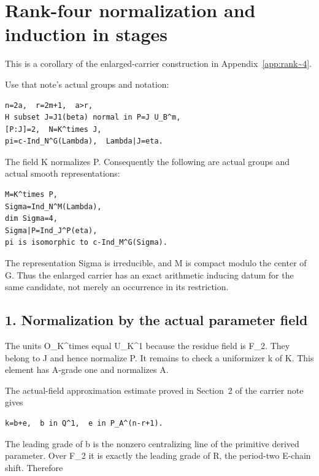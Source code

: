 \clearpage
\section{Rank-four normalization and induction in stages}\label{app:rank~4_stages}

This is a corollary of the enlarged-carrier construction in
Appendix~\ref{app:rank~4}.

Use that note's actual groups and notation:

\begin{Verbatim}[fontsize=\small,breaklines=true,breakanywhere=true]
n=2a,  r=2m+1,  a>r,
H subset J=J1(beta) normal in P=J U_B^m,
[P:J]=2,  N=K^times J,
pi=c-Ind_N^G(Lambda),  Lambda|J=eta.
\end{Verbatim}

The field K normalizes P. Consequently the following are actual groups
and actual smooth representations:

\begin{Verbatim}[fontsize=\small,breaklines=true,breakanywhere=true]
M=K^times P,
Sigma=Ind_N^M(Lambda),
dim Sigma=4,
Sigma|P=Ind_J^P(eta),
pi is isomorphic to c-Ind_M^G(Sigma).
\end{Verbatim}

The representation Sigma is irreducible, and M is compact modulo the
center of G. Thus the enlarged carrier has an exact arithmetic inducing
datum for the same candidate, not merely an occurrence in its
restriction.

\hypertarget{rank~4_stages-normalization-by-the-actual-parameter-field}{%
\subsection{1. Normalization by the actual parameter
field}\label{rank~4_stages-normalization-by-the-actual-parameter-field}}

The units O\_K\^{}times equal U\_K\^{}1 because the residue field is
F\_2. They belong to J and hence normalize P. It remains to check a
uniformizer k of K. This element has A-grade one and normalizes A.

The actual-field approximation estimate proved in Section~2 of the
carrier note gives

\begin{Verbatim}[fontsize=\small,breaklines=true,breakanywhere=true]
k=b+e,  b in Q^1,  e in P_A^(n-r+1).
\end{Verbatim}

The leading grade of b is the nonzero centralizing line of the primitive
derived parameter. Over F\_2 it is exactly the leading grade of R, the
period-two E-chain shift. Therefore

